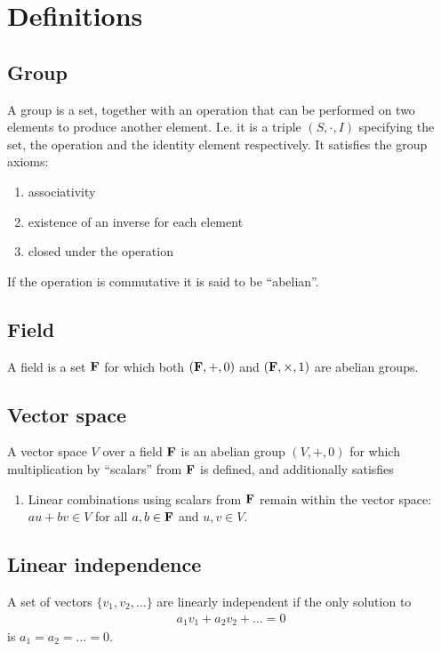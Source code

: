 \newcommand{\alphainv}{\alpha^{-1}}

\section{Definitions}

\subsection{Group}
A group is a set, together with an operation that can be performed on two
elements to produce another element. I.e. it is a triple $(S, \cdot, I)$
specifying the set, the operation and the identity element respectively. It
satisfies the group axioms:
\begin{enumerate}
\item associativity
\item existence of an inverse for each element
\item closed under the operation
\end{enumerate}
If the operation is commutative it is said to be ``abelian''.

\subsection{Field}
A field is a set $\mathbf{F}$ for which both $(\mathbf{F}, +, 0)$ and $(\mathbf{F}, \times, 1)$ are abelian groups.


\subsection{Vector space}
A vector space $V$ over a field $\mathbf{F}$ is an abelian group $(V, +, 0)$ for which
multiplication by ``scalars'' from $\mathbf{F}$ is defined, and additionally satisfies
\begin{enumerate}
\item Linear combinations using scalars from $\mathbf{F}$ remain within the vector
  space:\\
  $au + bv \in V$ for all $a, b \in \mathbf{F}$ and $u, v \in V$.
\end{enumerate}


\subsection{Linear independence}
A set of vectors $\{v_1, v_2, \ldots\}$ are linearly independent if the only
solution to
\begin{align*}
  a_1v_1 + a_2v_2 + \ldots = 0
\end{align*}
is $a_1 = a_2 = \ldots = 0$.


